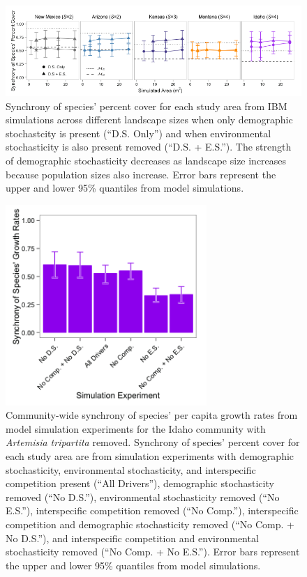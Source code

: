 \documentclass[12pt,]{article}
\begin{document}
\pagebreak{}

\begin{figure}[!ht]
  \centering
      \includegraphics[width=6in]{./components/formatted_figures/formatted_figureS3.png}
  \caption{Synchrony of species' percent cover for each study area from IBM simulations across different landscape sizes when only demographic stochastcity is present (``D.S. Only'') and when environmental stochasticity is also present removed (``D.S. + E.S.''). The strength of demographic stochasticity decreases as landscape size increases because population sizes also increase. Error bars represent the upper and lower 95\% quantiles from model simulations.}
\end{figure}

\pagebreak{}

\begin{figure}[!ht]
  \centering
      \includegraphics[width=3in]{./components/formatted_figures/formatted_figureS4.png}
  \caption{Community-wide synchrony of species' per capita growth rates from model simulation experiments for the Idaho community with \textit{Artemisia tripartita} removed. Synchrony of species' percent cover for each study area are from simulation experiments with demographic stochasticity, environmental stochasticity, and interspecific competition present (``All Drivers''), demographic stochasticity removed (``No D.S.''), environmental stochasticity removed (``No E.S.''), interspecific competition removed (``No Comp.''), interspecific competition and demographic stochasticity removed (``No Comp. + No D.S.''), and interspecific competition and environmental stochasticity removed (``No Comp. + No E.S.''). Error bars represent the upper and lower 95\% quantiles from model simulations.}
\end{figure}
\end{document}
